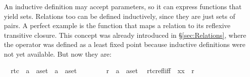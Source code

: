 %
\begin{isabellebody}%
\def\isabellecontext{Star}%
%
\isadelimtheory
%
\endisadelimtheory
%
\isatagtheory
%
\endisatagtheory
{\isafoldtheory}%
%
\isadelimtheory
%
\endisadelimtheory
%
\isamarkuptrue%
%
\begin{isamarkuptext}%
\label{sec:rtc}
%
An inductive definition may accept parameters, so it can express 
functions that yield sets.
Relations too can be defined inductively, since they are just sets of pairs.
A perfect example is the function that maps a relation to its
reflexive transitive closure.  This concept was already
introduced in \S\ref{sec:Relations}, where the operator  was
defined as a least fixed point because inductive definitions were not yet
available. But now they are:%
\end{isamarkuptext}%
\isamarkuptrue%
\isamarkupfalse%
\isanewline
\ \ rtc\ {}{}\ {}{}{}a\ {}\ {}a{}set\ {}\ {}{}a\ {}\ {}a{}set{}\ \ \ {}{}{}{}{}\ {}{}{}{}{}{}\ {}{}{}{}\isanewline
\ \ \ r\ {}{}\ {}{}{}a\ {}\ {}a{}set{}\isanewline
{}\isanewline
\ \ rtc{}refl{}iff{}{}\ \ {}{}x{}x{}\ {}\ r{}{}\isanewline

\end{isabellebody}
